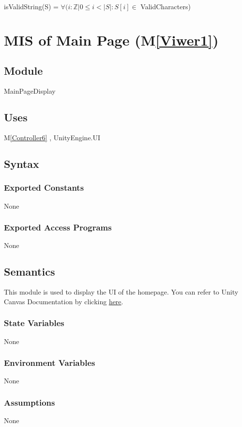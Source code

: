 \documentclass[12pt, titlepage]{article}
\newcommand{\mref}[1]{M\ref{#1}}
\begin{document}
\noindent isValidString(S) = $\forall(i : \mathbb{Z} | 0 \leq
i < |S| : S[i] \in $ ValidCharacters)

\newpage

\section{MIS of Main Page (\mref{Viwer1})}

\subsection{Module}
MainPageDisplay

\subsection{Uses}
\mref{Controller6} , 
UnityEngine.UI

\subsection{Syntax}
\subsubsection{Exported Constants}
None
\subsubsection{Exported Access Programs}
None

\subsection{Semantics}
This module is used to display the UI of the homepage.  You can refer to Unity Canvas Documentation by clicking \href{https://docs.unity3d.com/Packages/com.unity.ugui@1.0/manual/class-Canvas.html}{here}.
\subsubsection{State Variables}
None
\subsubsection{Environment Variables}
None
\subsubsection{Assumptions}
None
\end{document}
